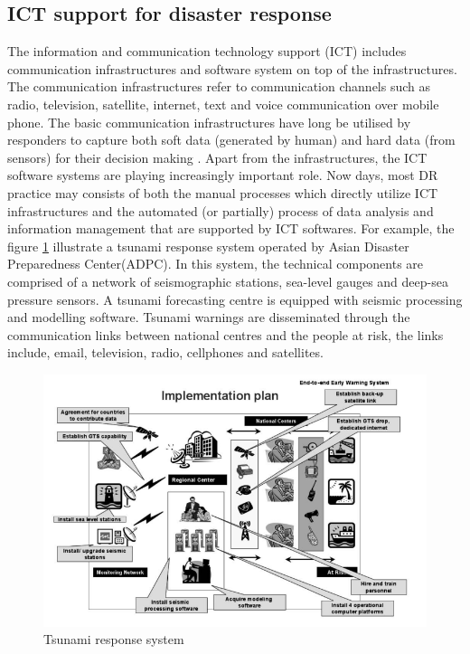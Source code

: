 \subsection{ICT support for disaster response}
The information and communication technology support (ICT) includes communication infrastructures and software system on top of the infrastructures. The communication infrastructures refer to communication channels such as radio, television, satellite, internet, text and voice communication over mobile phone. The basic communication infrastructures have long be utilised by responders to capture both soft data (generated by human) and hard data (from sensors) for their decision making \cite{Fischer2012}. Apart from the infrastructures, the ICT software systems are playing increasingly important role. Now days, most DR practice may consists  of both the manual processes which directly utilize ICT infrastructures and the automated (or partially) process of data analysis and information management that are supported by ICT softwares. For example, the figure \ref{fig:ICTExample} illustrate a tsunami response system operated by Asian Disaster Preparedness Center(ADPC). In this system,  the technical components are comprised of a network of seismographic stations, sea-level gauges and deep-sea pressure sensors. A tsunami forecasting centre is equipped with seismic processing and modelling software.  Tsunami warnings are disseminated through the communication links between national centres and the people at risk, the links include, email, television, radio, cellphones and satellites.\\

\begin{figure}[h]
  \centering
  \includegraphics[width=1\textwidth]{img/background/ICTExample}
  \caption{Tsunami response system}
  \label{fig:ICTExample}
\end{figure}

